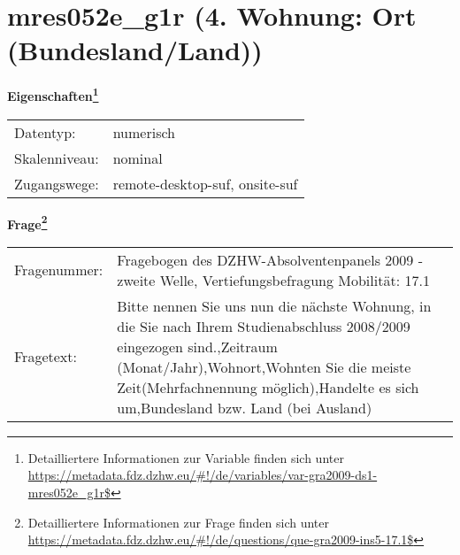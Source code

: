 
    \setcounter{footnote}{0}

    \vspace*{-1.8cm}
	\section{mres052e\_g1r (4. Wohnung: Ort (Bundesland/Land))}
	\label{section:mres052e_g1r}



    \vspace*{0.5cm}
    \noindent\textbf{Eigenschaften\footnote{Detailliertere Informationen zur Variable finden sich unter
		\url{https://metadata.fdz.dzhw.eu/\#!/de/variables/var-gra2009-ds1-mres052e_g1r$}}}\\
	\begin{tabularx}{\hsize}{@{}lX}
	Datentyp: & numerisch \\
	Skalenniveau: & nominal \\
	Zugangswege: &
	  remote-desktop-suf, 
	  onsite-suf
 \\
    \end{tabularx}



				\vspace*{0.5cm}
                \noindent\textbf{Frage\footnote{Detailliertere Informationen zur Frage finden sich unter
		              \url{https://metadata.fdz.dzhw.eu/\#!/de/questions/que-gra2009-ins5-17.1$}}}\\
				\begin{tabularx}{\hsize}{@{}lX}
					Fragenummer: &
					  Fragebogen des DZHW-Absolventenpanels 2009 - zweite Welle, Vertiefungsbefragung Mobilität:
					  17.1
 \\
					Fragetext: & Bitte nennen Sie uns nun die nächste Wohnung, in die Sie nach Ihrem Studienabschluss 2008/2009 eingezogen sind.,Zeitraum (Monat/Jahr),Wohnort,Wohnten Sie die meiste Zeit(Mehrfachnennung möglich),Handelte es sich um,Bundesland bzw. Land (bei Ausland) \\
				\end{tabularx}





